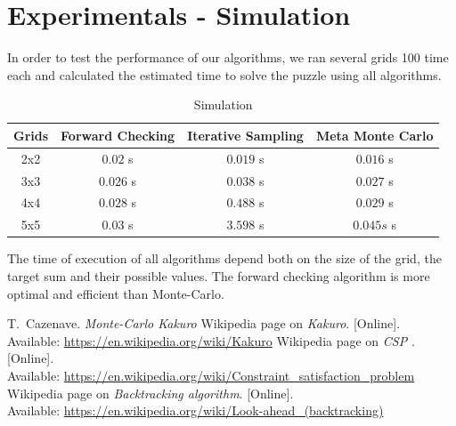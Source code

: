 \documentclass[journal, a4paper]{IEEEtran}
\begin{document}
\section{Experimentals - Simulation}
In order to test the performance of our algorithms, we ran several grids 100 time each and calculated the estimated time to solve the puzzle using all algorithms. \\
    \begin{table}[!hbt]
        \begin{center}
        \caption{Simulation}
        \label{tab:simParameters}
        \begin{tabular}{|c|c|c|c|}
            \hline
           Grids & Forward Checking &  Iterative Sampling & Meta Monte Carlo \\
            \hline
           2x2 & $0.02$ s  &  $ 0.019 $ s   &  $ 0.016 $ s  \\
            \hline
           3x3 & $0.026$ s  &  $ 0.038 $ s &  $ 0.027 $ s    \\
            \hline
           4x4 & $ 0.028  $ s  &  $ 0.488 $ s  &  $ 0.029 $ s   \\
            \hline
           5x5 & $ 0.03 $ s  &  $ 3.598 $ s &  $ 0.045s $ s    \\
            \hline
        \end{tabular}
        \end{center}
    \end{table}

The time of execution of all algorithms depend both on  the size of the grid, the target sum and their possible values.
The forward checking algorithm is more optimal and efficient than Monte-Carlo.\\
\begin{thebibliography}{5}
    T.~Cazenave. {\em Monte-Carlo Kakuro}
   Wikipedia page on {\em Kakuro}. [Online]. \\ Available:  \url{ https://en.wikipedia.org/wiki/Kakuro}
   Wikipedia page on {\em CSP }. [Online]. \\ Available:  \url{https://en.wikipedia.org/wiki/Constraint_satisfaction_problem}
   Wikipedia page on {\em Backtracking algorithm}. [Online]. \\ Available:  \url{https://en.wikipedia.org/wiki/Look-ahead_(backtracking)}
\end{thebibliography}
\end{document}
